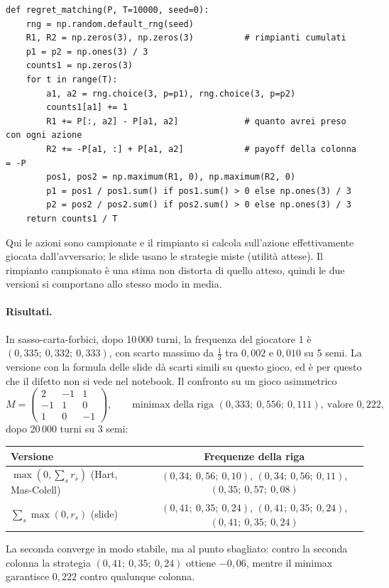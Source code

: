 \begin{lstlisting}
def regret_matching(P, T=10000, seed=0):
    rng = np.random.default_rng(seed)
    R1, R2 = np.zeros(3), np.zeros(3)          # rimpianti cumulati
    p1 = p2 = np.ones(3) / 3
    counts1 = np.zeros(3)
    for t in range(T):
        a1, a2 = rng.choice(3, p=p1), rng.choice(3, p=p2)
        counts1[a1] += 1
        R1 += P[:, a2] - P[a1, a2]             # quanto avrei preso con ogni azione
        R2 += -P[a1, :] + P[a1, a2]            # payoff della colonna = -P
        pos1, pos2 = np.maximum(R1, 0), np.maximum(R2, 0)
        p1 = pos1 / pos1.sum() if pos1.sum() > 0 else np.ones(3) / 3
        p2 = pos2 / pos2.sum() if pos2.sum() > 0 else np.ones(3) / 3
    return counts1 / T
\end{lstlisting}

Qui le azioni sono campionate e il rimpianto si calcola sull'azione effettivamente giocata
dall'avversario; le slide usano le strategie miste (utilità attese). Il rimpianto campionato
è una stima non distorta di quello atteso, quindi le due versioni si comportano allo stesso
modo in media.

\paragraph{Risultati.}
In sasso-carta-forbici, dopo 10\,000 turni, la frequenza del giocatore 1 è
$(0{,}335;\ 0{,}332;\ 0{,}333)$, con scarto massimo da $\tfrac13$ tra $0{,}002$ e $0{,}010$
su 5 semi. La versione con la formula delle slide dà scarti simili su questo gioco, ed è per
questo che il difetto non si vede nel notebook. Il confronto su un gioco asimmetrico
\[
  M = \begin{pmatrix} 2 & -1 & 1 \\ -1 & 1 & 0 \\ 1 & 0 & -1 \end{pmatrix},
  \qquad \text{minimax della riga } (0{,}333;\ 0{,}556;\ 0{,}111),\ \text{valore } 0{,}222,
\]
dopo 20\,000 turni su 3 semi:
\begin{center}
\renewcommand{\arraystretch}{1.2}
\begin{tabular}{lc}
\toprule
Versione & Frequenze della riga \\
\midrule
$\max(0, \sum_s r_s)$ (Hart, Mas-Colell) & $(0{,}34;\ 0{,}56;\ 0{,}10)$, $(0{,}34;\ 0{,}56;\ 0{,}11)$, $(0{,}35;\ 0{,}57;\ 0{,}08)$ \\
$\sum_s \max(0, r_s)$ (slide) & $(0{,}41;\ 0{,}35;\ 0{,}24)$, $(0{,}41;\ 0{,}35;\ 0{,}24)$, $(0{,}41;\ 0{,}35;\ 0{,}24)$ \\
\bottomrule
\end{tabular}
\end{center}
La seconda converge in modo stabile, ma al punto sbagliato: contro la seconda colonna la
strategia $(0{,}41;\ 0{,}35;\ 0{,}24)$ ottiene $-0{,}06$, mentre il minimax garantisce
$0{,}222$ contro qualunque colonna.

